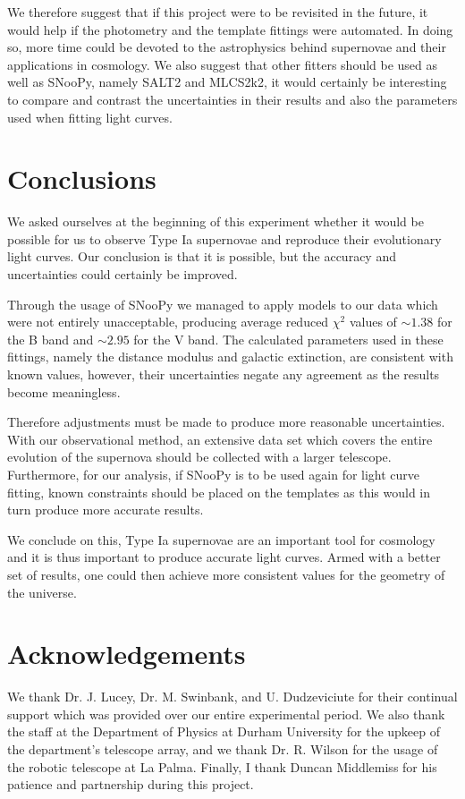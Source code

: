 \documentclass[twocolumn]{revtex4}
\begin{document}
We therefore suggest that if this project were to be revisited in the future, it would help if the photometry and the template fittings were automated. In doing so, more time could be devoted to the astrophysics behind supernovae and their applications in cosmology. We also suggest that other fitters should be used as well as SNooPy, namely SALT2 and MLCS2k2, it would certainly be interesting to compare and contrast the uncertainties in their results and also the parameters used when fitting light curves.

\vspace{-4ex}
\section{Conclusions}
\label{conclusions}
\vspace{-2ex}

We asked ourselves at the beginning of this experiment whether it would be possible for us to observe Type Ia supernovae and reproduce their evolutionary light curves. Our conclusion is that it is possible, but the accuracy and uncertainties could certainly be improved. 

Through the usage of SNooPy we managed to apply models to our data which were not entirely unacceptable, producing average reduced $\chi^2$ values of $\sim 1.38$ for the B band and $\sim 2.95$ for the V band. The calculated parameters used in these fittings, namely the distance modulus and galactic extinction, are consistent with known values, however, their uncertainties negate any agreement as the results become meaningless. 

Therefore adjustments must be made to produce more reasonable uncertainties. With our observational method, an extensive data set which covers the entire evolution of the supernova should be collected with a larger telescope. Furthermore, for our analysis, if SNooPy is to be used again for light curve fitting, known constraints should be placed on the templates as this would in turn produce more accurate results.

We conclude on this, Type Ia supernovae are an important tool for cosmology and it is thus important to produce accurate light curves. Armed with a better set of results, one could then achieve more consistent values for the geometry of the universe.

\vspace{-4ex}
\section*{Acknowledgements}
\vspace{-2ex}
We thank Dr. J. Lucey, Dr. M. Swinbank, and U. Dudzeviciute for their continual support which was provided over our entire experimental period. We also thank the staff at the Department of Physics at Durham University for the upkeep of the department's telescope array, and we thank Dr. R. Wilson for the usage of the robotic telescope at La Palma. Finally, I thank Duncan Middlemiss for his patience and partnership during this project.
\end{document}
